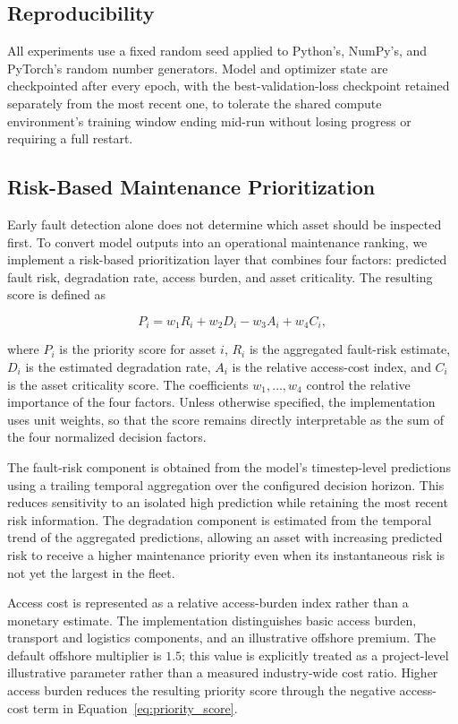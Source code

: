 \documentclass[conference]{IEEEtran}
\begin{document}
\subsection{Reproducibility}

All experiments use a fixed random seed applied to Python's, NumPy's, and
PyTorch's random number generators. Model and optimizer state are
checkpointed after every epoch, with the best-validation-loss checkpoint
retained separately from the most recent one, to tolerate the shared
compute environment's training window ending mid-run without losing
progress or requiring a full restart.
\subsection{Risk-Based Maintenance Prioritization}

Early fault detection alone does not determine which asset should be
inspected first. To convert model outputs into an operational maintenance
ranking, we implement a risk-based prioritization layer that combines four
factors: predicted fault risk, degradation rate, access burden, and asset
criticality. The resulting score is defined as

\begin{equation}
P_i =
w_1 R_i +
w_2 D_i -
w_3 A_i +
w_4 C_i ,
\label{eq:priority_score}
\end{equation}

where $P_i$ is the priority score for asset $i$, $R_i$ is the aggregated
fault-risk estimate, $D_i$ is the estimated degradation rate, $A_i$ is the
relative access-cost index, and $C_i$ is the asset criticality score.
The coefficients $w_1,\ldots,w_4$ control the relative importance of the
four factors. Unless otherwise specified, the implementation uses unit
weights, so that the score remains directly interpretable as the sum of the
four normalized decision factors.

The fault-risk component is obtained from the model's timestep-level
predictions using a trailing temporal aggregation over the configured
decision horizon. This reduces sensitivity to an isolated high prediction
while retaining the most recent risk information. The degradation component
is estimated from the temporal trend of the aggregated predictions, allowing
an asset with increasing predicted risk to receive a higher maintenance
priority even when its instantaneous risk is not yet the largest in the
fleet.

Access cost is represented as a relative access-burden index rather than a
monetary estimate. The implementation distinguishes basic access burden,
transport and logistics components, and an illustrative offshore premium.
The default offshore multiplier is $1.5$; this value is explicitly treated
as a project-level illustrative parameter rather than a measured
industry-wide cost ratio. Higher access burden reduces the resulting
priority score through the negative access-cost term in
Equation~\ref{eq:priority_score}.
\end{document}
